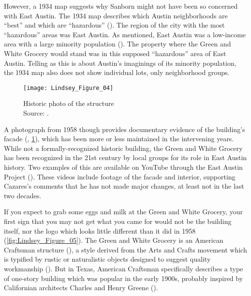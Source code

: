 However, a 1934 map suggests why Sanborn might not have been so concerned with East Austin. The 1934 map describes which Austin neighborhoods are “best” and which are “hazardous” (\cite{miller}). The region of the city with the most “hazardous” areas was East Austin. As mentioned, East Austin was a low-income area with a large minority population (\cite{hernandez}). The property where the Green and White Grocery would stand was in this supposed “hazardous” area of East Austin. Telling as this is about Austin's imaginings of its minority population, the 1934 map also does not show individual lots, only neighborhood groups.

\begin{figure}[!htb]
	\texttt{[image: Lindsey\_Figure\_04]}
	\caption{Historic photo of the structure\\
		{\normalfont\scriptsize %
		Source:  \textcite{anon}.
	}}
	\label{fig:Lindsey_Figure_04}
\end{figure}

A photograph from 1958 though provides documentary evidence of the building's facade (\cite{anon}, \cref{fig:Lindsey_Figure_04}), which has been more or less maintained in the intervening years. While not a formally-recognized historic building, the Green and White Grocery has been recognized in the 21st century by local groups for its role in East Austin history. Two examples of this are available on YouTube through the East Austin Project (\cites{becker}{lepe}). These videos include footage of the facade and interior, supporting Cazares's comments that he has not made major changes, at least not in the last two decades.


If you expect to grab some eggs and milk at the Green and White Grocery, your first sign that you may not get what you came for would not be the building itself, nor the logo which looks little different than it did in 1958 (\cref{fig:Lindsey_Figure_05}). The Green and White Grocery is an American Craftsman structure (\cite[75-76]{hardy}), a style derived from the Arts and Crafts movement which is typified by rustic or naturalistic objects designed to suggest quality workmanship (\cite[42-56]{frampton}). But in Texas, American Craftsman specifically describes a type of one-story building which was popular in the early 1900s, probably inspired by Californian architects Charles and Henry Greene (\cite{robinson}).

